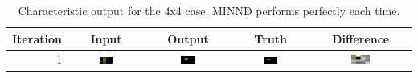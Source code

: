 \documentclass[twoside]{article}
\begin{document}
\begin{multicols}{2}
\begin{table}
\begin{tabular}{| r | c | c | c | c |}
\hline
Iteration & Input & Output & Truth & Difference \\ \hline
1 & 
\includegraphics[width=0.2\textwidth]{images/4x4/1/in} &
\includegraphics[width=0.2\textwidth]{images/4x4/1/out} &
\includegraphics[width=0.2\textwidth]{images/4x4/1/truth} &
\includegraphics[width=0.2\textwidth]{images/4x4/1/dif} \\ \hline
\end{tabular}
\caption{Characteristic output for the 4x4 case. MINND performs perfectly each time.}
\end{table}


\end{multicols}
\end{document}
